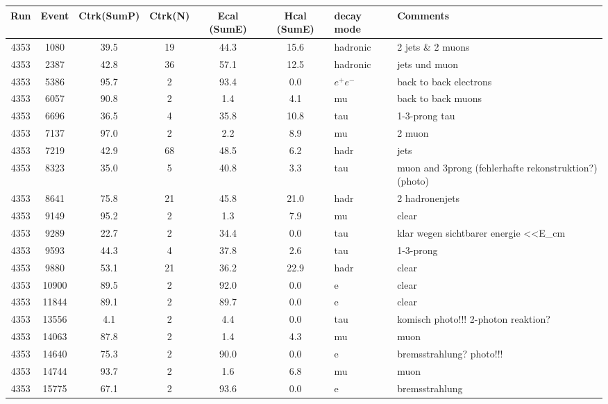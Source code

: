 \begin{tabular}{ccccccll}
	\toprule
	Run & Event & Ctrk(SumP) & Ctrk(N) & Ecal (SumE) & Hcal (SumE) & decay mode & Comments \\
	\midrule
4353 & 1080  & 39.5 & 19 & 44.3 & 15.6 & hadronic & 2 jets \& 2 muons                                      \\
4353 & 2387  & 42.8 & 36 & 57.1 & 12.5 & hadronic & jets und muon                                          \\
4353 & 5386  & 95.7 & 2  & 93.4 & 0.0  & $e^+e^-$ & back to back electrons                                 \\
4353 & 6057  & 90.8 & 2  & 1.4  & 4.1  & mu   & back to back muons                                     \\
4353 & 6696  & 36.5 & 4  & 35.8 & 10.8 & tau  & 1-3-prong tau                                          \\
4353 & 7137  & 97.0 & 2  & 2.2  & 8.9  & mu   & 2 muon                                                 \\
4353 & 7219  & 42.9 & 68 & 48.5 & 6.2  & hadr & jets                                                   \\
4353 & 8323  & 35.0 & 5  & 40.8 & 3.3  & tau  & muon and 3prong (fehlerhafte rekonstruktion?) (photo)  \\
4353 & 8641  & 75.8 & 21 & 45.8 & 21.0 & hadr & 2 hadronenjets                                         \\
4353 & 9149  & 95.2 & 2  & 1.3  & 7.9  & mu   & clear                                                  \\
4353 & 9289  & 22.7 & 2  & 34.4 & 0.0  & tau  & klar wegen sichtbarer energie \textless\textless E\_cm \\
4353 & 9593  & 44.3 & 4  & 37.8 & 2.6  & tau  & 1-3-prong                                              \\
4353 & 9880  & 53.1 & 21 & 36.2 & 22.9 & hadr & clear                                                  \\
4353 & 10900 & 89.5 & 2  & 92.0 & 0.0  & e    & clear                                                  \\
4353 & 11844 & 89.1 & 2  & 89.7 & 0.0  & e    & clear                                                  \\
4353 & 13556 & 4.1  & 2  & 4.4  & 0.0  & tau  & komisch photo!!! 2-photon reaktion?                    \\
4353 & 14063 & 87.8 & 2  & 1.4  & 4.3  & mu   & muon                                                   \\
4353 & 14640 & 75.3 & 2  & 90.0 & 0.0  & e    & bremsstrahlung? photo!!!                               \\
4353 & 14744 & 93.7 & 2  & 1.6  & 6.8  & mu   & muon                                                   \\
4353 & 15775 & 67.1 & 2  & 93.6 & 0.0  & e    & bremsstrahlung                                         \\
	\bottomrule
\end{tabular}